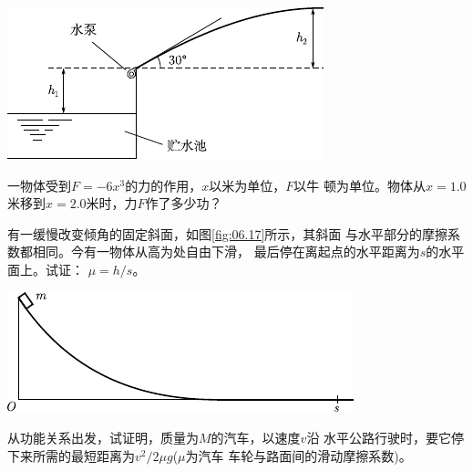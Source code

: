 \begin{exercises}
\begin{figurex}
    \centering
    \includegraphics{figure/fig06.16}
    \caption{}
    \label{fig:06.16}
\end{figurex}

\exercise 一物体受到$ F = - 6 x ^ { 3 } $的力的作用，$ x $以米为单位，$ F $以牛
顿为单位。物体从$ x = 1.0 $米移到$ x = 2.0 $米时，力$ F $作了多少功？

\exercise 有一缓慢改变倾角的固定斜面，如图\ref{fig:06.17}\;所示，其斜面
与水平部分的摩擦系数都相同。今有一物体从高为处自由下滑，
最后停在离起点的水平距离为$ s $的水平面上。试证： $ \mu = h / s $。
\begin{figurex}
    \centering
    \includegraphics{figure/fig06.17}
    \caption{}
    \label{fig:06.17}
\end{figurex}

\exercise 从功能关系出发，试证明，质量为$ M $的汽车，以速度$ v $沿
水平公路行驶时，要它停下来所需的最短距离为$ v ^ { 2 } / 2 \mu g $($ \mu $为汽车
车轮与路面间的滑动摩擦系数)。


\end{exercises}
